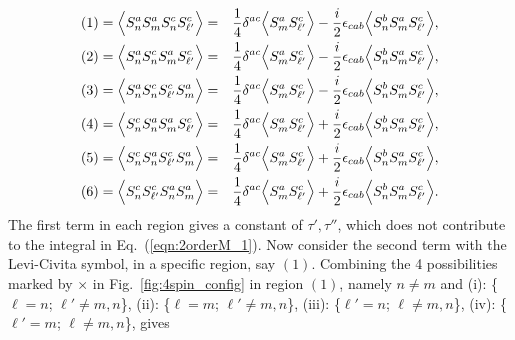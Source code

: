 \documentclass[aps,prb,twocolumn,superscriptaddress]{revtex4-1}
\begin{document}
\begin{eqnarray}
(1)=\Bigl\langle{S^{a}_{n}S^{a}_{m}S^{c}_{n}S^{c}_{\ell'}\Bigr\rangle}&=&\frac{1}{4}\delta^{ac}\Bigl\langle{S^{a}_{m}S^{c}_{\ell'}\Bigr\rangle}-\frac{i}{2}\epsilon_{cab}\Bigl\langle{S^{b}_{n}S^{a}_{m}S^{c}_{\ell'}\Bigr\rangle}, \nonumber \\ 
(2)=\Bigl\langle{S^{a}_{n}S^{c}_{n}S^{a}_{m}S^{c}_{\ell'}\Bigr\rangle}&=&\frac{1}{4}\delta^{ac}\Bigl\langle{S^{a}_{m}S^{c}_{\ell'}\Bigr\rangle}-\frac{i}{2}\epsilon_{cab}\Bigl\langle{S^{b}_{n}S^{a}_{m}S^{c}_{\ell'}\Bigr\rangle}, \nonumber \\ 
(3)=\Bigl\langle{S^{a}_{n}S^{c}_{n}S^{c}_{\ell'}S^{a}_{m}\Bigr\rangle}&=&\frac{1}{4}\delta^{ac}\Bigl\langle{S^{a}_{m}S^{c}_{\ell'}\Bigr\rangle}-\frac{i}{2}\epsilon_{cab}\Bigl\langle{S^{b}_{n}S^{a}_{m}S^{c}_{\ell'}\Bigr\rangle}, \nonumber \\ 
(4)=\Bigl\langle{S^{c}_{n}S^{a}_{n}S^{a}_{m}S^{c}_{\ell'}\Bigr\rangle}&=&\frac{1}{4}\delta^{ac}\Bigl\langle{S^{a}_{m}S^{c}_{\ell'}\Bigr\rangle}+\frac{i}{2}\epsilon_{cab}\Bigl\langle{S^{b}_{n}S^{a}_{m}S^{c}_{\ell'}\Bigr\rangle}, \nonumber \\ 
(5)=\Bigl\langle{S^{c}_{n}S^{a}_{n}S^{c}_{\ell'}S^{a}_{m}\Bigr\rangle}&=&\frac{1}{4}\delta^{ac}\Bigl\langle{S^{a}_{m}S^{c}_{\ell'}\Bigr\rangle}+\frac{i}{2}\epsilon_{cab}\Bigl\langle{S^{b}_{n}S^{a}_{m}S^{c}_{\ell'}\Bigr\rangle}, \nonumber \\ 
(6)=\Bigl\langle{S^{c}_{n}S^{c}_{\ell'}S^{a}_{n}S^{a}_{m}\Bigr\rangle}&=&\frac{1}{4}\delta^{ac}\Bigl\langle{S^{a}_{m}S^{c}_{\ell'}\Bigr\rangle}+\frac{i}{2}\epsilon_{cab}\Bigl\langle{S^{b}_{n}S^{a}_{m}S^{c}_{\ell'}\Bigr\rangle}. \nonumber \\ \label{eqn:2orderM_2}
\end{eqnarray}
The first term in each region gives a constant of $\tau', \tau''$, which does not  contribute to the integral in Eq.~(\ref{eqn:2orderM_1}). Now consider the second term with the Levi-Civita symbol, in a specific region, say $(1)$. Combining the 4 possibilities  marked by $\times$ in Fig.~\ref{fig:4spin_config} in region $(1)$, namely $n \ne m$ and (i): \{$\ell=n$; $\ell'\ne m,n$\}, (ii): \{$\ell=m$; $\ell'\ne m,n$\}, (iii): \{$\ell'=n$; $\ell\ne m,n$\}, (iv): \{$\ell'=m$; $\ell\ne m,n$\}, gives
\end{document}
